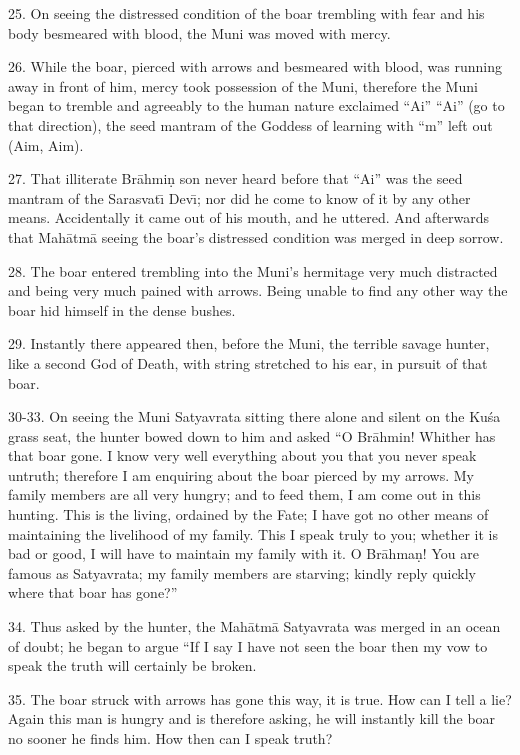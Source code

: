 25. On seeing the distressed condition of the boar trembling with fear and his body besmeared with blood, the Muni was moved with mercy.

26. While the boar, pierced with arrows and besmeared with blood, was running away in front of him, mercy took possession of the Muni, therefore the Muni began to tremble and agreeably to the human nature exclaimed ``Ai'' ``Ai'' (go to that direction), the seed mantram of the Goddess of learning with ``m'' left out (Aim, Aim).

27. That illiterate Br\=ahmi\d{n} son never heard before that ``Ai'' was the seed mantram of the Sarasvat\={\i} Dev\={\i}; nor did he come to know of it by any other means. Accidentally it came out of his mouth, and he uttered. And afterwards that Mah\=atm\=a seeing the boar's distressed condition was merged in deep sorrow.

28. The boar entered trembling into the Muni's hermitage very much distracted and being very much pained with arrows. Being unable to find any other way the boar hid himself in the dense bushes.

29. Instantly there appeared then, before the Muni, the terrible savage hunter, like a second God of Death, with string stretched to his ear, in pursuit of that boar.

30-33. On seeing the Muni Satyavrata sitting there alone and silent on the Ku\'sa grass seat, the hunter bowed down to him and asked ``O Br\=ahmin! Whither has that boar gone. I know very well everything about you that you never speak untruth; therefore I am enquiring about the boar pierced by my arrows. My family members are all very hungry; and to feed them, I am come out in this hunting. This is the living, ordained by the Fate; I have got no other means of maintaining the livelihood of my family. This I speak truly to you; whether it is bad or good, I will have to maintain my family with it. O Br\=ahma\d{n}! You are famous as Satyavrata; my family members are starving; kindly reply quickly where that boar has gone?''

34. Thus asked by the hunter, the Mah\=atm\=a Satyavrata was merged in an ocean of doubt; he began to argue ``If I say I have not seen the boar then my vow to speak the truth will certainly be broken.

35. The boar struck with arrows has gone this way, it is true. How can I tell a lie? Again this man is hungry and is therefore asking, he will instantly kill the boar no sooner he finds him. How then can I speak truth?

